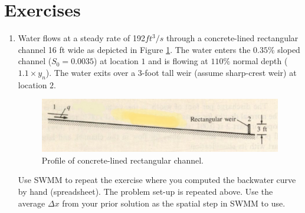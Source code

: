 \documentclass[12pt]{article}
\begin{document}
\section*{\small{Exercises}}
\begin{enumerate}
\item Water flows at a steady rate of 192$ft^3/s$ through a concrete-lined rectangular channel 16 ft wide as depicted in Figure \ref{fig:channel_profile}. The water enters the $0.35 \%$ sloped channel ($S_0 = 0.0035$) at location $1$ and is flowing at $110\%$ normal depth ($1.1 \times y_n$).  The water exits over a 3-foot tall weir (assume sharp-crest weir) at location $2$.

\begin{figure}[htbp] %
   \centering
   \includegraphics[width=6in]{channel_profile.jpg} 
   \caption{Profile of concrete-lined rectangular channel.}
   \label{fig:channel_profile}
\end{figure}

Use SWMM to repeat the exercise where you computed the backwater curve by hand (spreadsheet).  The problem set-up is repeated above.  Use the average $\Delta x$ from your prior solution as the spatial step in SWMM to use.


\end{enumerate}
\end{document}
